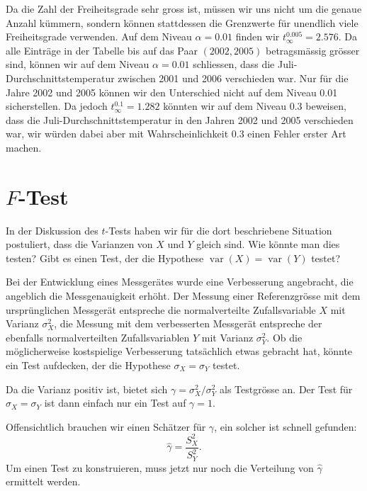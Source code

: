 Da die Zahl der Freiheitsgrade sehr gross ist, müssen wir
uns nicht um die genaue Anzahl kümmern, sondern können stattdessen
die Grenzwerte für unendlich viele Freiheitsgrade verwenden.
Auf
dem Niveau $\alpha=0.01$ finden wir $t_{\infty}^{0.005}=2.576$.
Da alle Einträge in der Tabelle bis auf das Paar $(2002,2005)$
betragsmässig grösser sind, können wir auf dem Niveau $\alpha=0.01$
schliessen, dass die Juli-Durchschnittstemperatur zwischen
2001 und 2006 verschieden war.
Nur für die Jahre 2002 und 2005
können wir den Unterschied nicht auf dem Niveau 0.01 sicherstellen.
Da jedoch $t_{\infty}^{0.1}=1.282$ könnten wir auf dem Niveau
$0.3$ beweisen, dass die Juli-Durchschnittstemperatur in den
Jahren 2002 und 2005 verschieden war, wir würden dabei aber 
mit Wahrscheinlichkeit $0.3$ einen Fehler erster Art machen.

\section{\texorpdfstring{$F$}{F}-Test}
In der Diskussion des $t$-Tests haben wir für die dort beschriebene
Situation postuliert, dass die Varianzen von $X$ und $Y$ gleich sind.
Wie könnte man dies testen? Gibt es einen Test, der die Hypothese
$\operatorname{var}(X)=\operatorname{var}(Y)$ testet? 

Bei der Entwicklung eines Messgerätes wurde eine Verbesserung angebracht,
die angeblich die Messgenauigkeit erhöht.
Der Messung einer Referenzgrösse
mit dem ursprünglichen Messgerät entspreche die normalverteilte
Zufallsvariable $X$ mit Varianz $\sigma_X^2$, die Messung mit dem verbesserten
Messgerät entspreche der ebenfalls normalverteilten Zufallsvariablen
$Y$ mit Varianz $\sigma_Y^2$.
Ob die möglicherweise kostspielige 
Verbesserung tatsächlich etwas gebracht hat, könnte ein Test aufdecken,
der die Hypothese $\sigma_X=\sigma_Y$ testet.

Da die Varianz positiv ist, bietet sich $\gamma=\sigma_X^2/\sigma_Y^2$ als
Testgrösse an.
Der Test für $\sigma_X=\sigma_Y$ ist dann einfach nur
ein Test auf $\gamma=1$.

Offensichtlich brauchen wir einen Schätzer für $\gamma$, ein solcher ist
schnell gefunden:
\begin{equation}
\hat\gamma=\frac{S_X^2}{S_Y^2}.
\label{ftest-gamma-schaetzer}
\end{equation}
Um einen Test zu konstruieren, muss jetzt nur noch die Verteilung von
$\hat\gamma$ ermittelt werden.

